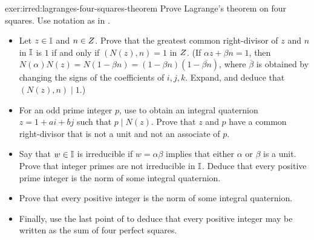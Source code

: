 \begin{exer}{}{exer:irred:lagranges-four-squares-theorem}
  Prove Lagrange's theorem on four squares. Use notation as in
  .
  \begin{itemize}
  \item Let $z \in \mathbb{I}$ and $n \in Z$. Prove that the greatest
    common right-divisor of $z$ and $n$ in $\mathbb{I}$ is $1$ if and
    only if $(N(z), n) = 1$ in $Z$. (If $\alpha z + \beta n = 1$,
    then
    $N(\alpha)N(z) = N(1 - \beta n) = (1 - \beta n)(1 -
    \overline{\beta n})$, where $\overline{\beta}$ is obtained by
    changing the signs of the coefficients of $i, j, k$. Expand, and
    deduce that $(N(z), n) \mid 1$.)
  \item For an odd prime integer $p$, use
     to
    obtain an integral quaternion $z = 1 + ai + bj$ such that
    $p \mid N(z)$. Prove that $z$ and $p$ have a common right-divisor
    that is not a unit and not an associate of $p$.
  \item Say that $w \in \mathbb{I}$ is irreducible if $w = \alpha\beta$
    implies that either $\alpha$ or $\beta$ is a unit. Prove that
    integer primes are not irreducible in $\mathbb{I}$. Deduce that
    every positive prime integer is the norm of some integral
    quaternion.
  \item Prove that every positive integer is the norm of some integral
    quaternion.
  \item Finally, use the last point of
     to deduce that
    every positive integer may be written as the sum of four perfect
    squares.
  \end{itemize}
\end{exer}

